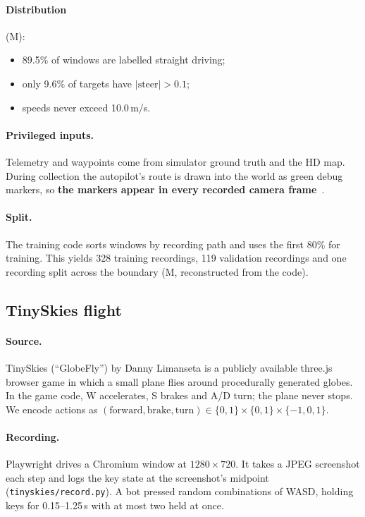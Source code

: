 \documentclass[11pt]{article}
\begin{document}
\paragraph{Distribution} (M):
\begin{itemize}
  \item 89.5\% of windows are labelled straight driving;
  \item only 9.6\% of targets have $|\text{steer}| > 0.1$;
  \item speeds never exceed 10.0\,m/s.
\end{itemize}

\paragraph{Privileged inputs.} Telemetry and waypoints come from simulator ground truth and the HD map. During collection the autopilot's route is drawn into the world as green debug markers, so \textbf{the markers appear in every recorded camera frame}~\cite{kieto2026carla}.

\paragraph{Split.} The training code sorts windows by recording path and uses the first 80\% for training. This yields 328 training recordings, 119 validation recordings and one recording split across the boundary (M, reconstructed from the code).

\subsection{TinySkies flight}
\label{sec:tinyskies-data}

\paragraph{Source.} TinySkies (``GlobeFly'') by Danny Limanseta is a publicly available three.js browser game in which a small plane flies around procedurally generated globes. In the game code, W accelerates, S brakes and A/D turn; the plane never stops. We encode actions as $(\text{forward},\text{brake},\text{turn})\in\{0,1\}\times\{0,1\}\times\{-1,0,1\}$.

\paragraph{Recording.} Playwright drives a Chromium window at $1280\times720$. It takes a JPEG screenshot each step and logs the key state at the screenshot's midpoint (\texttt{tinyskies/record.py}). A bot pressed random combinations of WASD, holding keys for 0.15--1.25\,s with at most two held at once.
\end{document}
